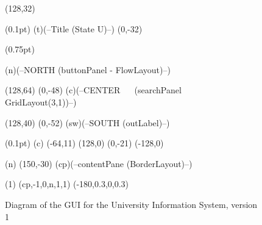 

  
\begin {figure}

\Draw

\MinNodeSize(128,32)

\PenSize(0.1pt)
\RectNode(t)(--Title
		(State U)--)
\Move(0,-32)

\PenSize(0.75pt)

\RectNode(n)(--NORTH
		(buttonPanel - FlowLayout)--)


\MinNodeSize(128,64)
\Move(0,-48)
\RectNode(c)(--CENTER ~~
		(searchPanel ~~
		GridLayout(3,1))--)

\MinNodeSize(128,40)
\Move(0,-52)
\RectNode(sw)(--SOUTH
		(outLabel)--)

\PenSize(0.1pt)
\MoveToLoc(c)
\Move(-64,11) \Line(128,0)
\Move(0,-21) \Line(-128,0)

\MoveToLoc(n)
\Move(150,-30)
\Node(cp)(--contentPane
	    (BorderLayout)--)

\ArrowHeads(1)
\CurvedEdgeAt(cp,-1,0,n,1,1)
	     (-180,0.3,0,0.3)



\EndDraw

\caption {Diagram of the GUI for the University Information System,
version 1}

\label {fig:univLayout}

\end {figure}


